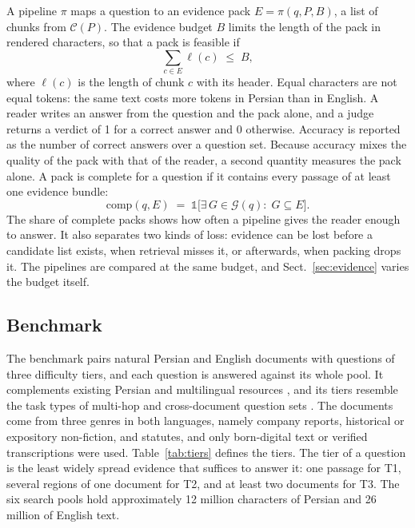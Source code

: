 A pipeline $\pi$ maps a question to an evidence pack $E=\pi(q,P,B)$, a list of chunks from $\mathcal{C}(P)$. The evidence budget $B$ limits the length of the pack in rendered characters, so that a pack is feasible if
\begin{equation}
\sum_{c\in E}\ell(c)\;\le\;B,
\label{eq:budget}
\end{equation}
where $\ell(c)$ is the length of chunk $c$ with its header. Equal characters are not equal tokens: the same text costs more tokens in Persian than in English. A reader writes an answer from the question and the pack alone, and a judge returns a verdict of 1 for a correct answer and 0 otherwise. Accuracy is reported as the number of correct answers over a question set. Because accuracy mixes the quality of the pack with that of the reader, a second quantity measures the pack alone. A pack is complete for a question if it contains every passage of at least one evidence bundle:
\begin{equation}
\mathrm{comp}(q,E)\;=\;\mathbb{1}\bigl[\exists\,G\in\mathcal{G}(q):\;G\subseteq E\bigr].
\label{eq:complete}
\end{equation}
The share of complete packs shows how often a pipeline gives the reader enough to answer. It also separates two kinds of loss: evidence can be lost before a candidate list exists, when retrieval misses it, or afterwards, when packing drops it. The pipelines are compared at the same budget, and Sect.~\ref{sec:evidence} varies the budget itself.

\subsection{Benchmark}
\label{sec:benchmark}
The benchmark pairs natural Persian and English documents with questions of three difficulty tiers, and each question is answered against its whole pool. It complements existing Persian and multilingual resources \citep{darvishi2023pquad,khashabi2021parsinlu,zinvandi2025famteb,zhang2023miracl}, and its tiers resemble the task types of multi-hop and cross-document question sets \citep{yang2018hotpotqa,tang2024multihoprag}. The documents come from three genres in both languages, namely company reports, historical or expository non-fiction, and statutes, and only born-digital text or verified transcriptions were used. Table~\ref{tab:tiers} defines the tiers. The tier of a question is the least widely spread evidence that suffices to answer it: one passage for T1, several regions of one document for T2, and at least two documents for T3. The six search pools hold approximately 12 million characters of Persian and 26 million of English text.


